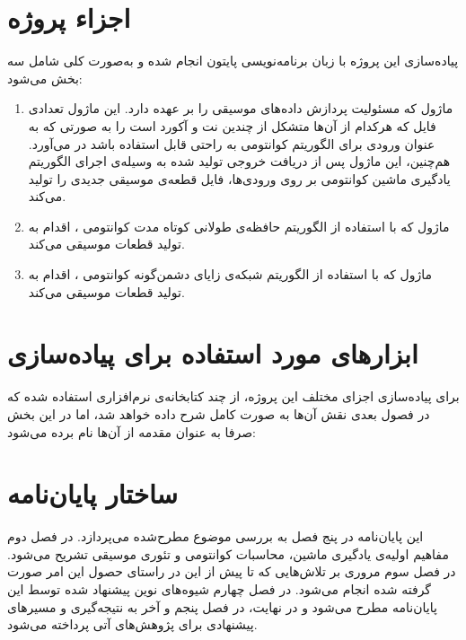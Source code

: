 \newpage
\section{اجزاء پروژه} \label{sec:parts}
پیاده‌سازی این پروژه با زبان برنامه‌نویسی پایتون انجام شده و به‌صورت کلی شامل سه بخش می‌شود:
\begin{enumerate}
    \item ماژول
    که مسئولیت پردازش داده‌های موسیقی را بر عهده دارد. این ماژول تعدادی فایل که هرکدام از آن‌ها متشکل از چندین نت و آکورد است را به صورتی که به عنوان ورودی برای الگوریتم کوانتومی به راحتی قابل استفاده باشد در می‌آورد. هم‌چنین، این ماژول پس از دریافت خروجی تولید شده به وسیله‌ی اجرای الگوریتم یادگیری ماشین کوانتومی بر روی ورودی‌ها، فایل قطعه‌ی موسیقی جدیدی را تولید می‌کند.
    \item ماژول
    که با استفاده از الگوریتم حافظه‌ی طولانی کوتاه مدت کوانتومی
    \cite{chen_qlstm}،
    اقدام به تولید قطعات موسیقی می‌کند.
    
    \item ماژول
    که با استفاده از الگوریتم شبکه‌ی زایای دشمن‌گونه کوانتومی
    \cite{lloyd_qugan} \cite{zoufal_qugan}،
    اقدام به تولید قطعات موسیقی می‌کند.

\end{enumerate}

\section{ابزارهای مورد استفاده برای پیاده‌سازی}

برای پیاده‌سازی اجزای مختلف این پروژه، از چند کتابخانه‌ی نرم‌افزاری استفاده شده که در فصول بعدی نقش آن‌ها به صورت کامل شرح داده خواهد شد، اما در این بخش صرفا به عنوان مقدمه از آن‌ها نام برده می‌شود:

\vspace{-1.7cm}
\section{ساختار پایان‌نامه}
این پایان‌نامه در پنج فصل به بررسی موضوع مطرح‌شده می‌پردازد. در فصل دوم مفاهیم اولیه‌ی یادگیری ماشین، محاسبات کوانتومی و تئوری موسیقی تشریح می‌شود. در فصل سوم مروری بر تلاش‌هایی که تا پیش از این در راستای حصول این امر صورت گرفته شده انجام می‌شود.
در فصل چهارم شیوه‌های نوین پیشنهاد شده توسط این پایان‌نامه مطرح می‌شود و در نهایت، در فصل پنجم و آخر به نتیجه‌گیری و مسیرهای پیشنهادی برای پژوهش‌های آتی پرداخته می‌شود.